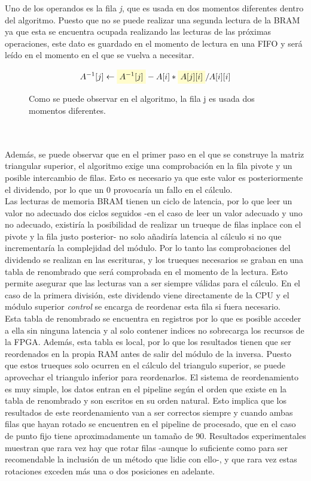 Uno de los operandos es la fila \textit{j}, que es usada en dos momentos diferentes dentro del algoritmo. Puesto que no se puede realizar una segunda lectura de la BRAM ya que esta se encuentra ocupada realizando las lecturas de las próximas operaciones, este dato es guardado en el momento de lectura en una FIFO y será leído en el momento en el que se vuelva a necesitar.
\newcommand{\highlight}[1]{%
  \colorbox{yellow!20}{$\displaystyle#1$}}
\begin{figure}[h!]
\[A^{-1}[j] \gets \highlight{A^{-1}[j]}-A[i]*\highlight{A[j][i]}/A[i][i]\]
\caption{Como se puede observar en el algoritmo, la fila j es usada dos momentos diferentes.}
\end{figure}
\\
\\
Además, se puede observar que en el primer paso en el que se construye la matriz triangular superior, el algoritmo exige una comprobación en la fila pivote y un posible intercambio de filas. Esto es necesario ya que este valor es posteriormente el dividendo, por lo que un 0 provocaría un fallo en el cálculo.
\\
Las lecturas de memoria BRAM tienen un ciclo de latencia, por lo que leer un valor no adecuado dos ciclos seguidos -en el caso de leer un valor adecuado y uno no adecuado, existiría la posibilidad de realizar un trueque de filas inplace con el pivote y la fila justo posterior- no solo añadiría latencia al cálculo si no que incrementaría la complejidad del módulo. Por lo tanto las comprobaciones del dividendo se realizan en las escrituras, y los trueques necesarios se graban en una tabla de renombrado que será comprobada en el momento de la lectura. Esto permite asegurar que las lecturas van a ser siempre válidas para el cálculo. En el caso de la primera división, este dividendo viene directamente de la CPU y el módulo superior \textit{control} se encarga de reordenar esta fila si fuera necesario.
\\
Esta tabla de renombrado se encuentra en registros por lo que es posible acceder a ella sin ninguna latencia y al solo contener indices no sobrecarga los recursos de la FPGA. Además, esta tabla es local, por lo que los resultados tienen que ser reordenados en la propia RAM antes de salir del módulo de la inversa. Puesto que estos trueques solo ocurren en el cálculo del triangulo superior, se puede aprovechar el triangulo inferior para reordenarlos. El sistema de reordenamiento es muy simple, los datos entran en el pipeline según el orden que existe en la tabla de renombrado y son escritos en su orden natural. Esto implica que los resultados de este reordenamiento van a ser correctos siempre y cuando ambas filas que hayan rotado se encuentren en el pipeline de procesado, que en el caso de  punto fijo tiene aproximadamente un tamaño de 90. Resultados experimentales muestran que rara vez hay que rotar filas -aunque lo suficiente como para ser recomendable la inclusión de un método que lidie con ello-, y que rara vez estas rotaciones exceden más una o dos posiciones en adelante.
